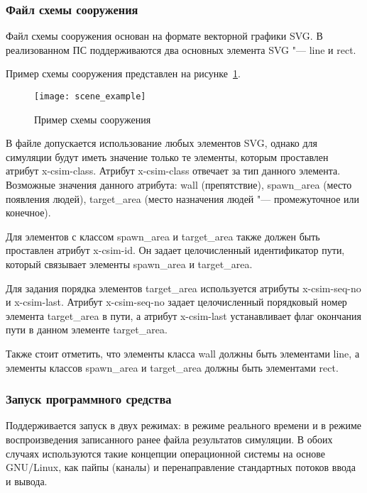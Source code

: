 \subsubsection{Файл схемы сооружения}
\label{sec:manual:input:building_scheme}

Файл схемы сооружения основан на формате векторной графики SVG.
В реализованном ПС поддерживаются два основных элемента SVG "--- line и rect.

Пример схемы сооружения представлен на рисунке~\ref{sec:manual:input:building_scheme:svg_listing}.

\begin{figure}[!ht]
  \centering
  \texttt{[image: scene\_example]}
  \caption{Пример схемы сооружения}
  \label{sec:manual:input:building_scheme:svg_listing}
\end{figure}

В файле допускается использование любых элементов SVG, однако для симуляции будут иметь значение только те элементы, которым проставлен атрибут x-csim-class.
Атрибут x-csim-class отвечает за тип данного элемента.  Возможные значения данного атрибута:
  wall (препятствие),
  spawn\_area (место появления людей),
  target\_area (место назначения людей "--- промежуточное или конечное).

Для элементов с классом spawn\_area и target\_area также должен быть проставлен атрибут x-csim-id.
Он задает целочисленный идентификатор пути, который связывает элементы spawn\_area и target\_area.

Для задания порядка элементов target\_area используется атрибуты x-csim-seq-no и x-csim-last.
Атрибут x-csim-seq-no задает целочисленный порядковый номер элемента target\_area в пути,
а атрибут x-csim-last устанавливает флаг окончания пути в данном элементе target\_area.

Также стоит отметить, что элементы класса wall должны быть элементами line,
а элементы классов spawn\_area и target\_area должны быть элементами rect.

\subsubsection{Запуск программного средства}
\label{sec:manual:launch}

Поддерживается запуск в двух режимах: в режиме реального времени и в режиме воспроизведения записанного ранее файла результатов симуляции.
В обоих случаях используются такие концепции операционной системы на основе GNU/Linux, как пайпы (каналы) и перенаправление стандартных потоков ввода и вывода.

